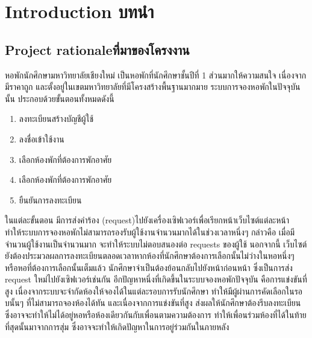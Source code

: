 \chapter{\ifenglish Introduction \else บทนำ\fi}
\section{\ifenglish Project rationale\else ที่มาของโครงงาน\fi}

หอพักนักศึกษามหาวิทยาลัยเชียงใหม่ เป็นหอพักที่นักศึกษาชั้นปีที่ 1 ส่วนมากให้ความสนใจ เนื่องจากมีราคาถูก และตั้งอยู่ในเขตมหาวิทยาลัยที่มีโครงสร้างพื้นฐานมากมาย
ระบบการจองหอพักในปัจจุบันนั้น ประกอบด้วยขั้นตอนทั้งหมดดังนี้
\begin{enumerate}
    \item ลงทะเบียนสร้างบัญชีผู้ใช้
    \item ลงชื่อเข้าใช้งาน
    \item เลือกห้องพักที่ต้องการพักอาศัย
    \item เลือกห้องพักที่ต้องการพักอาศัย
    \item ยืนยันการลงทะเบียน
\end{enumerate}
ในแต่ละขั้นตอน มีการส่งคำร้อง (request)ไปยังเครื่องเซิฟเวอร์เพื่อเรียกหน้าเว็บไซต์แต่ละหน้า 
ทำให้ระบบการจองหอพักไม่สามารถรองรับผู้ใช้งานจำนวนมากได้ในช่วงเวลาหนึ่งๆ กล่าวคือ เมื่อมีจำนวนผู้ใช้งานเป็นจำนวนมาก จะทำให้ระบบไม่ตอบสนองต่อ requests ของผู้ใช้
นอกจากนี้ เว็บไซต์ยังต้องประมวลผลการลงทะเบียนตลอดเวลาหากห้องที่นักศึกษาต้องการเลือกนั้นไม่ว่างในหอหนึ่งๆ 
หรือหอที่ต้องการเลือกนั้นเต็มแล้ว นักศึกษาจำเป็นต้องย้อนกลับไปยังหน้าก่อนหน้า ซึ่งเป็นการส่ง request ใหม่ไปยังเซิฟเวอร์เช่นกัน 
อีกปัญหาหนึ่งที่เกิดขึ้นในระบบจองหอพักปัจจุบัน คือการแข่งขันที่สูง เนื่องจากระบบจะจำกัดห้องให้จองได้ในแต่ละรอบการรับนักศึกษา ทำให้มีผู้ผ่านการคัดเลือกในรอบนั้นๆ ที่ไม่สามารถจองห้องได้ทัน
และเนื่องจากการแข่งขันที่สูง ส่งผลให้นักศึกษาต้องรีบลงทะเบียน ซึ่งอาจจะทำให้ไม่ได้อยู่หอหรือห้องเดียวกันกับเพื่อนตามความต้องการ ทำให้เพื่อนร่วมห้องที่ได้ในท้ายที่สุดนั้นมาจากการสุ่ม ซึ่งอาจจะทำให้เกิดปัญหาในการอยู่ร่วมกันในภายหลัง

